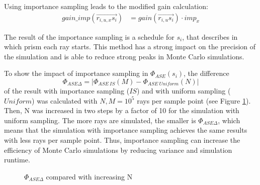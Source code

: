 Using importance sampling leads to the modified gain calculation:
\begin{align}
  gain\_imp(\overrightarrow{r_{i,u,x}s_i})        &= gain(\overrightarrow{r_{i,u}s_i}) \cdot imp_x
\end{align}


The result of the importance sampling is a schedule for $s_i$, that
describes in which prism each ray starts.
This method has a strong impact on the precision of the simulation
and is able to reduce strong peaks in Monte Carlo simulations.

To show the impact of importance sampling in $\Phi_{ASE}(s_i)$, the difference
\[\Phi_{ASE\Delta} = |\Phi_{ASE~IS}(M) - \Phi_{ASE~Uniform}(N)|\] of the 
result with importance sampling ($IS$) and with uniform sampling ($Uniform$) was calculated with 
$N,M = 10^5$ rays per sample point (see Figure \ref{graphic:importance}). 
Then, N was increased in two steps by a factor of 10 for the simulation with uniform sampling.
The more rays are simulated, the smaller is $\Phi_{ASE\Delta}$, which 
means that the simulation
with importance sampling achieves the same results with less
rays per sample point. Thus, importance sampling can increase the
efficiency of Monte Carlo simulations by reducing variance 
and simulation runtime. 
\begin{figure}[H]
  \centerline
  {}
  \caption{$\Phi_{ASE\Delta}$ compared with increasing N}
  \label{graphic:importance}
\end{figure}

